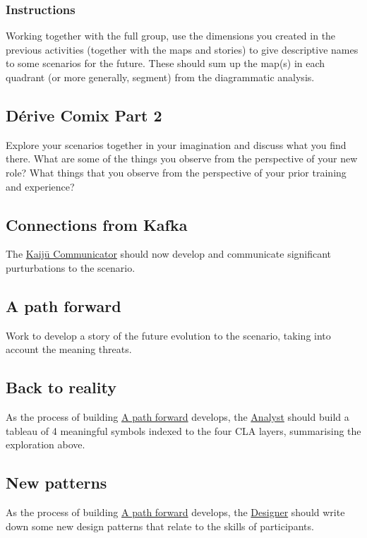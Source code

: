 \documentclass[11pt]{article}
\begin{document}
\subsubsection{Instructions}
\label{sec:orgcf8e046}

Working together with the full group, use the dimensions you created
in the previous activities (together with the maps and stories) to
give descriptive names to some scenarios for the future.  These should
sum up the map(s) in each quadrant (or more generally, segment) from
the diagrammatic analysis.
\subsection{Dérive Comix Part 2}
\label{f447153f-7ff5-449d-bb08-67f579dda53f}
Explore your scenarios together in your imagination and discuss what
you find there.  What are some of the things you observe from the
perspective of your new role?  What things that you observe from the
perspective of your prior training and experience?
\subsection{Connections from Kafka}
\label{34be214c-5885-4794-b93c-84e49ddad18b}
The \hyperref[a0796d9e-664b-46fa-bb37-7f6a6fc15584]{Kaijū Communicator} should now develop and communicate significant
purturbations to the scenario.
\subsection{A path forward}
\label{7c0dce3b-d5ea-4712-a771-6ff26f143686}
Work to develop a story of the future evolution to the scenario,
taking into account the meaning threats.
\subsection{Back to reality}
\label{e38d2006-bcf7-494b-bd51-d8932b1ed0cd}
As the process of building \hyperref[7c0dce3b-d5ea-4712-a771-6ff26f143686]{A path forward} develops, the \hyperref[5826c7d9-8962-433d-83c5-27a5196908ea]{Analyst} should
build a tableau of 4 meaningful symbols indexed to the four CLA
layers, summarising the exploration above.
\subsection{New patterns}
\label{ed238393-a7e4-4a0d-9eb2-3d6ab745c170}
As the process of building \hyperref[7c0dce3b-d5ea-4712-a771-6ff26f143686]{A path forward} develops, the \hyperref[48a1d6a3-800d-46bd-8a4a-0d3414ecf150]{Designer}
should write down some new design patterns that relate to the skills
of participants.
\end{document}
